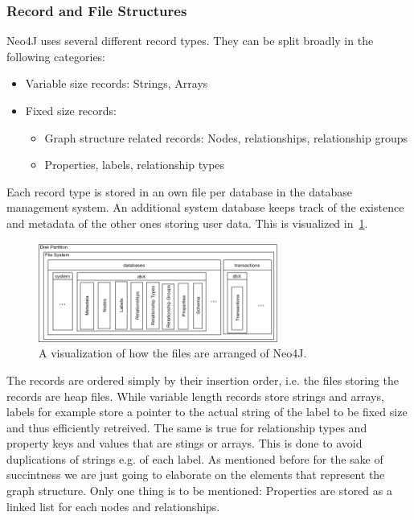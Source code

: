         \subsubsection*{Record and File Structures}
        Neo4J uses several different record types. They can be split broadly in the following categories:
        \begin{itemize}
         \item Variable size records: Strings, Arrays
         \item Fixed size records:
         \begin{itemize}
          \item Graph structure related records: Nodes, relationships, relationship groups
          \item Properties, labels, relationship types
         \end{itemize}
        \end{itemize}
        
        Each record type is stored in an own file per database in the database management system.
        An additional system database keeps track of the existence and metadata of the other ones storing user data.
        This is visualized in~\ref{n4j-disk}.
        \begin{figure}[htp]
            \begin{center}
                \includegraphics[keepaspectratio,height=0.4\textheight,width=0.7\textwidth]{img/03-preliminaries/N4J_disk_view.png}
            \end{center}
            \caption{A visualization of how the files are arranged of Neo4J.}
            \label{n4j-disk}
        \end{figure}
        
        The records are ordered simply by their insertion order, i.e. the files storing the records are heap files.
        While variable length records store strings and arrays, labels for example store a pointer to the actual string of the label to be fixed size and thus efficiently retreived.
        The same is true for relationship types and property keys and values that are stings or arrays.
        This is done to avoid duplications of strings e.g. of each label.
        As mentioned before for the sake of succintness we are just going to elaborate on the elements that represent the graph structure. 
        Only one thing is to be mentioned: 
        Properties are stored as a linked list for each nodes and relationships.
        
